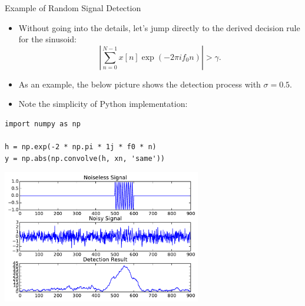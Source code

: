 \documentclass[10pt, aspectratio=169]{beamer} %
\begin{document}
\begin{frame}[allowframebreaks=0.8,fragile]
 {Example of Random Signal Detection}
\begin{itemize}
\item Without going into the details, let's jump directly to the derived decision
rule for the sinusoid:
\[
\left|\sum_{n=0}^{N-1} x[n]\exp(-2\pi i f_0 n) \right| > \gamma.
\]
\item As an example, the below picture shows the detection process with $\sigma = 0.5$.

\item Note the simplicity of Python implementation:
\end{itemize}
\begin{center}
\begin{minipage}{5cm}
\begin{lstlisting}
import numpy as np

h = np.exp(-2 * np.pi * 1j * f0 * n)
y = np.abs(np.convolve(h, xn, 'same'))
\end{lstlisting}
\end{minipage}
\end{center}
\centerline{\includegraphics[width=0.65\textwidth]{rayleighSinusoid.pdf}}
\end{frame}
\end{document}
